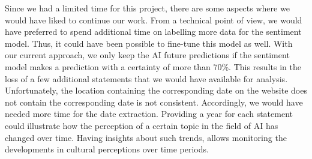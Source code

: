 Since we had a limited time for this project, there are some aspects where we would have liked to continue our work.
From a technical point of view, we would have preferred to spend additional time on labelling more data for the sentiment model.
Thus, it could have been possible to fine-tune this model as well.
With our current approach, we only keep the AI future predictions if the sentiment model makes a prediction with a certainty of more than 70\%.
This results in the loss of a few additional statements that we would have available for analysis.
\\
Unfortunately, the location containing the corresponding date on the website does not contain the corresponding date is not consistent.
Accordingly, we would have needed more time for the date extraction.
Providing a year for each statement could illustrate how the perception of a certain topic in the field of AI has changed over time.
Having insights about such trends, allows monitoring the developments in cultural perceptions over time periods.
\\





